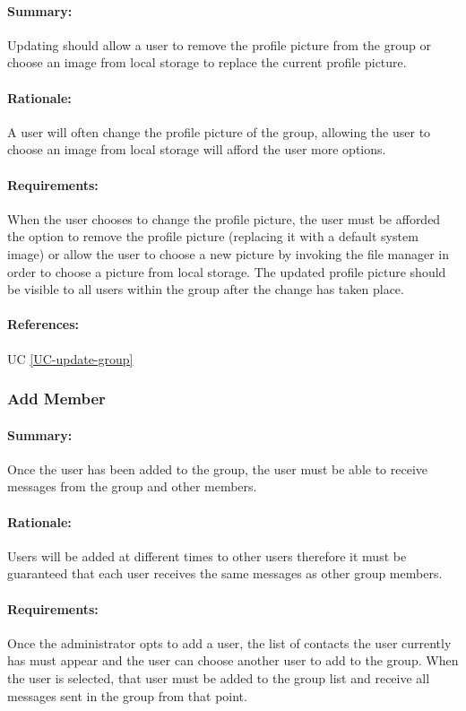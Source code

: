 \documentclass[11pt]{article}
\begin{document}
\paragraph{Summary:}
Updating should allow a user to remove the profile picture from the group or choose an image from local storage to replace the current profile picture.
\paragraph{Rationale:}
A user will often change the profile picture of the group, allowing the user to choose an image from local storage will afford the user more options.
\paragraph{Requirements:}
When the user chooses to change the profile picture, the user must be afforded the option to remove the profile picture (replacing it with a default system image) or allow the user to choose a new picture by invoking the file manager in order to choose a picture from local storage. The updated profile picture should be visible to all users within the group after the change has taken place.
\paragraph{References:} UC \ref{UC-update-group}

\subsubsection{Add Member} \label{FR-add-member}
\paragraph{Summary:}
Once the user has been added to the group, the user must be able to receive messages from the group and other members.
\paragraph{Rationale:}
Users will be added at different times to other users therefore it must be guaranteed that each user receives the same messages as other group members.
\paragraph{Requirements:}
Once the administrator opts to add a user, the list of contacts the user currently has must appear and the user can choose another user to add to the group. When the user is selected, that user must be added to the group list and receive all messages sent in the group from that point.
\end{document}
